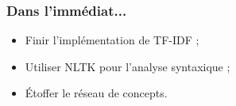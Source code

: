 \documentclass{beamer}
\begin{document}
\begin{frame}
	\frametitle{Dans l'immédiat...}
	\begin{itemize}
		\item Finir l'implémentation de TF-IDF ;
		\item Utiliser NLTK pour l'analyse syntaxique ;
		\item Étoffer le réseau de concepts.
	\end{itemize}
\end{frame}
\end{document}
